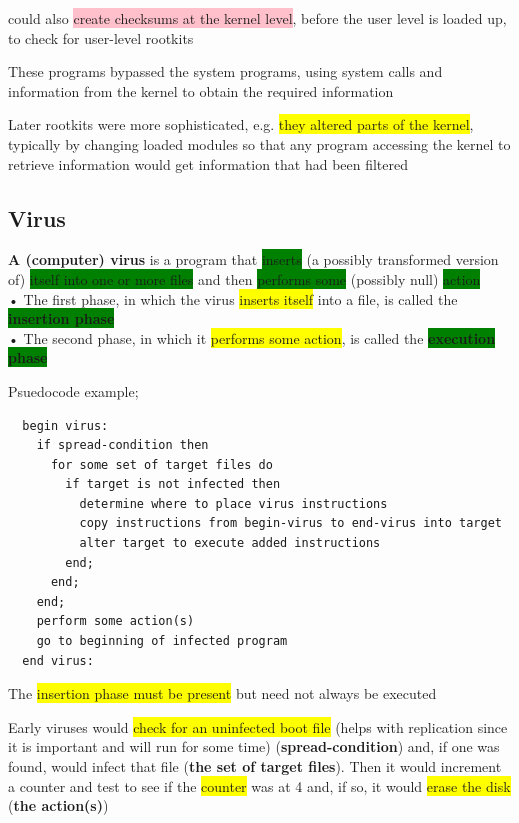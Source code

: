 \documentclass[]{project_plan}
\begin{document}
could also \colorbox{pink}{create checksums at the kernel level}, before the user level is loaded up,
to check for user-level rootkits

These programs bypassed the system programs, using system calls and
information from the kernel to obtain the required information

Later rootkits were more sophisticated, e.g. \colorbox{yellow}{they altered parts of the kernel}, typically by
changing loaded modules so that any program accessing the kernel to retrieve
information would get information that had been filtered

\subsection{Virus}

\textbf{A (computer) virus} is a program that \colorbox{green}{inserts} (a possibly transformed version of)
\colorbox{green}{itself into one } \colorbox{green}{or more files} and then \colorbox{green}{performs some} (possibly null) \colorbox{green}{action}\\
• The first phase, in which the virus \colorbox{yellow}{inserts itself} into a file, is called the \colorbox{green}{\textbf{insertion phase}}\\
• The second phase, in which it \colorbox{yellow}{performs some action}, is called the \colorbox{green}{\textbf{execution phase}}

Psuedocode example;
\begin{lstlisting}
  begin virus:
    if spread-condition then
      for some set of target files do
        if target is not infected then
          determine where to place virus instructions
          copy instructions from begin-virus to end-virus into target
          alter target to execute added instructions
        end;
      end;
    end;
    perform some action(s)
    go to beginning of infected program
  end virus:
\end{lstlisting}

The \colorbox{yellow}{insertion phase must be present} but need not always be executed

Early viruses would \colorbox{yellow}{check for an uninfected boot file} (helps with replication since it is important and will run for some time) (\textbf{spread-condition})
and, if one was found, would infect that file (\textbf{the set of target files}).
Then it would increment a counter and test to see
if the \colorbox{yellow}{counter} was at 4 and, if so, it would \colorbox{yellow}{erase the disk} (\textbf{the action(s)})
\end{document}
